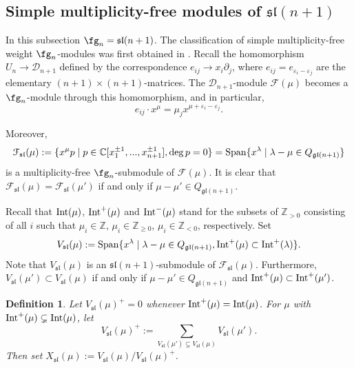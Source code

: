 \documentclass[12pt]{amsart}
\newcommand{\C}{{\mathbb C}}
\newtheorem{defn}[thm]{Definition}
\begin{document}
\subsection{Simple multiplicity-free modules of $\mathfrak{sl}({n+1})$}\label{subsec-sln-mult-free}  In this subsection $\fg_n=\mathfrak{sl}(n+1)$. The classification of simple multiplicity-free weight $\fg_n$-modules was first obtained in \cite{BBL}. Recall the homomorphism $U_n \to {\mathcal D}_{n+1}$ defined by the correspondence $e_{ij} \to x_i \partial_j$, where $ e_{ij} = e_{\varepsilon_i - \varepsilon_j}$ are the elementary $(n+1)\times(n+1)$-matrices. The $\mathcal{D}_{n+1}$-module  ${\mathcal F} (\mu)$ becomes a $\fg_n$-module through this homomorphism, and in particular,
$$
e_{ij} \cdot x^{\mu} =  \mu_j x^{\mu + \varepsilon_i- \varepsilon_j}.
$$

Moreover,
$$
{\mathcal F}_{\mathfrak{sl}} (\mu):= \{ x^{\mu} p \; | \; p \in \C [x_1^{\pm1},...,x_{n+1}^{\pm 1}], \deg p = 0\} =  {\rm Span} \{ x^{\lambda} \; | \; \lambda - \mu \in Q_{\mathfrak{gl}(n+1)} \}
$$
is a  multiplicity-free $\fg_n$-submodule of ${\mathcal F} (\mu)$. It is clear that ${\mathcal F}_{\mathfrak{sl}} (\mu)  = {\mathcal F}_{\mathfrak{sl}}(\mu')$ if and only if  $\mu - \mu' \in Q_{\mathfrak{gl}(n+1)} $. 

Recall that ${\rm Int} (\mu)$, ${\rm Int}^+ (\mu)$ and ${\rm Int}^- (\mu)$ stand for the subsets of $\mathbb Z_{> 0}$ consisting of all $i$ such that $\mu_i \in {\mathbb Z}$, $\mu_i \in {\mathbb Z}_{\geq 0}$, $\mu_i \in {\mathbb Z}_{< 0}$,  respectively.  Set
$$
V_{\mathfrak{sl}} (\mu): = {\rm Span} \{ x^{\lambda} \; | \; \lambda - \mu \in Q_{\mathfrak{gl}(n+1)},   {\rm Int}^+ (\mu) \subset  {\rm Int}^+ (\lambda) \}.
$$
Note that $V_{\mathfrak{sl}} (\mu)$ is an  $\mathfrak{sl}({n+1})$-submodule of ${\mathcal F}_{\mathfrak{sl}} (\mu)$. Furthermore, $V_{\mathfrak{sl}} (\mu') \subset V_{\mathfrak{sl}} (\mu)$ if and only if $\mu - \mu' \in Q_{\mathfrak{gl}(n+1)} $ and ${\rm Int}^+ (\mu) \subset  {\rm Int}^+ (\mu')$. 

\begin{defn} \label{def-f} Let  $V_{\mathfrak{sl}}(\mu)^+ = 0$ whenever ${\rm Int}^+ (\mu) = {\rm Int}  (\mu)$. For  $\mu$ with ${\rm Int}^+ (\mu) \subsetneq {\rm Int}  (\mu)$,  let
$$
V_{\mathfrak{sl}}(\mu)^+ := \sum_{V_{\mathfrak{sl}} (\mu') \subsetneq V_{\mathfrak{sl}} (\mu)} V_{\mathfrak{sl}} (\mu'). 
$$
Then set $X_{\mathfrak{sl}}(\mu) := V_{\mathfrak{sl}} (\mu)/ V_{\mathfrak{sl}} (\mu)^+$.
\end{defn}
\end{document}
